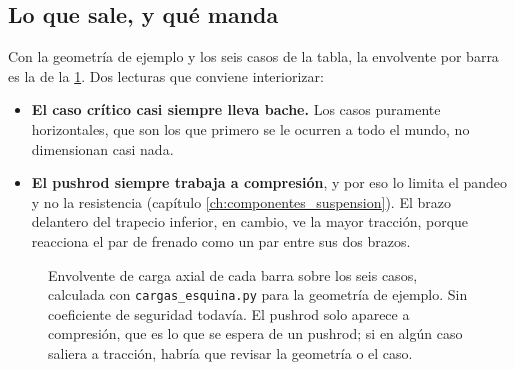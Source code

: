 \subsection{Lo que sale, y qué manda}

Con la geometría de ejemplo y los seis casos de la tabla, la envolvente por
barra es la de la \cref{fig:cargas:envolvente}. Dos lecturas que conviene
interiorizar:

\begin{itemize}
  \item \textbf{El caso crítico casi siempre lleva bache.} Los casos puramente
        horizontales, que son los que primero se le ocurren a todo el mundo, no
        dimensionan casi nada.
  \item \textbf{El pushrod siempre trabaja a compresión}, y por eso lo limita el
        pandeo y no la resistencia (capítulo \ref{ch:componentes_suspension}). El
        brazo delantero del trapecio inferior, en cambio, ve la mayor tracción,
        porque reacciona el par de frenado como un par entre sus dos brazos.
\end{itemize}

\begin{figure}[htbp]
\centering
{}
\caption[Envolvente de cargas por barra]{Envolvente de carga axial de cada barra
sobre los seis casos, calculada con \texttt{cargas\_esquina.py} para la
geometría de ejemplo. Sin coeficiente de seguridad todavía. El pushrod solo
aparece a compresión, que es lo que se espera de un pushrod; si en algún caso
saliera a tracción, habría que revisar la geometría o el caso.}
\label{fig:cargas:envolvente}
\end{figure}

